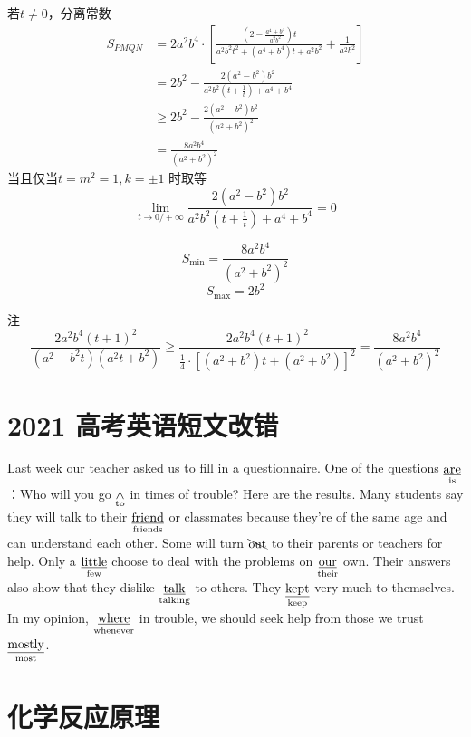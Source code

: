 \documentclass[UTF8]{article}
\begin{document}
若$t \ne   0$，分离常数
$$
\begin{aligned}
 {S_{PMQN}}& = 2{a^2}{b^4} \cdot \left[ {\frac{{\left( {2 - \frac{{{a^4} + {b^4}}}{{{a^2}{b^2}}}} \right)t}}{{{a^2}{b^2}{t^2} + ({a^4} + {b^4})t + {a^2}{b^2}}} + \frac{1}{{{a^2}{b^2}}}} \right]
 \\&=2{b^2} - \frac{{2({a^2} - {b^2}){b^2}}}{{{a^2}{b^2}\left( {t + \frac{1}{t}} \right) + {a^4} + {b^4}}}
 \\&\ge 2{b^2} - \frac{{2({a^2} - {b^2}){b^2}}}{{{{({a^2} + {b^2})}^2}}}
 \\&=\frac{{8{a^2}{b^4}}}{{{{({a^2} + {b^2})}^2}}}
\end{aligned}
$$
当且仅当$t=m^2=1,k=\pm 1$ 时取等
$$
\lim_{t \to 0/+\infty} \frac{{2({a^2} - {b^2}){b^2}}}{{{a^2}{b^2}\left( {t + \frac{1}{t}} \right) + {a^4} + {b^4}}}=0
$$

$$
  {S_{{\text{min}}}}=\frac{{8{a^2}{b^4}}}{{{{({a^2} + {b^2})}^2}}}
  $$
$$
  {S_{{\text{max}}}}  = 2{b^2}
$$

注
$$
\frac{{2{a^2}{b^4}{{({t} + 1)}^2}}}{{({a^2} + {b^2}{t})({a^2}{t} + {b^2})}}\ge\frac{{2{a^2}{b^4}{{(t + 1)}^2}}}{{\frac{1}{4} \cdot {{[({a^2} + {b^2})t + ({a^2} + {b^2})]}^2}}}=\frac{{8{a^2}{b^4}}}{{{{({a^2} + {b^2})}^2}}}
$$
\section{2021 高考英语短文改错}

Last week our teacher asked us to fill in a questionnaire. One of the questions $\rm\underset{is}{\underline{are}}$：Who will you go $\rm \underset{to}{\wedge}$ in times of trouble? Here are the results. Many students say they will talk to their $\rm \underset{friends}{\underline{friend}}$ or classmates because they're of the same age and can understand each other. Some will turn $\rm \bcancel{\text{out}}$ to their parents or teachers for help. Only a $\rm \underset{few}{\underline{little}}$ choose to deal with the problems on $\rm \underset{their}{\underline{our}}$ own. Their answers also show that they dislike $\rm \underset{talking}{\underline{talk}}$ to others. They $\rm \underset{keep}{\underline{kept}}$ very much to themselves. In my opinion, $\rm \underset{whenever}{\underline{where}}$ in trouble, we should seek help from those we trust $\rm \underset{most}{\underline{mostly}}$.

\section{化学反应原理}
\end{document}
